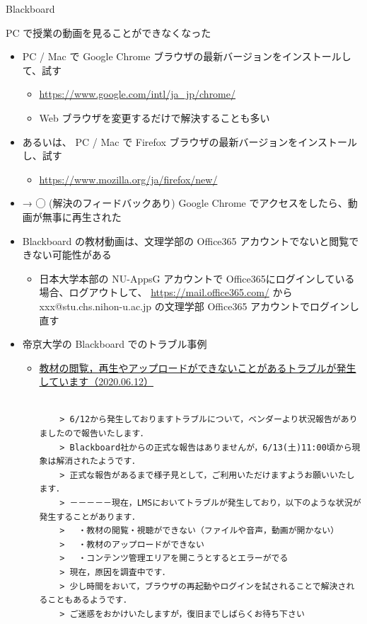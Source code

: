 \documentclass[a4j,10pt]{jsarticle}
\begin{document}
{\begin{frame}[label={sec:org166405d},fragile]{Blackboard}
\begin{block}{PC で授業の動画を見ることができなくなった}
\begin{itemize}
\par
\item PC / Mac で Google Chrome ブラウザの最新バージョンをインストールして、試す
\begin{itemize}
\item \url{https://www.google.com/intl/ja\_jp/chrome/}
\item Web ブラウザを変更するだけで解決することも多い
\end{itemize}
\par
\item あるいは、 PC / Mac で Firefox ブラウザの最新バージョンをインストールし、試す
\begin{itemize}
\item \url{https://www.mozilla.org/ja/firefox/new/}
\end{itemize}
\par
\item → ◯ (解決のフィードバックあり) Google Chrome でアクセスをしたら、動画が無事に再生された
\par
\item Blackboard の教材動画は、文理学部の Office365 アカウントでないと閲覧できない可能性がある
\begin{itemize}
\item 日本大学本部の NU-AppsG アカウントで Office365にログインしている場合、ログアウトして、
\url{https://mail.office365.com/} から xxx@stu.chs.nihon-u.ac.jp の文理学部 Office365 アカウントでログインし直す
\end{itemize}
\par
\item 帝京大学の Blackboard でのトラブル事例
\begin{itemize}
\item \href{http://www.lt-lab.teikyo-u.ac.jp/lms-ss/index.php?\%A4\%AA\%C3\%CE\%A4\%E9\%A4\%BB\%2F\%B2\%E1\%B5\%EE\%A4\%CE\%C9\%D4\%B6\%F1\%B9\%E7\%BE\%F0\%CA\%F3}{教材の閲覧，再生やアップロードができないことがあるトラブルが発生しています（2020.06.12）}
\par
\begin{verbatim}

    > 6/12から発生しておりますトラブルについて，ベンダーより状況報告がありましたので報告いたします．
    > Blackboard社からの正式な報告はありませんが，6/13(土)11:00頃から現象は解消されたようです．
    > 正式な報告があるまで様子見として，ご利用いただけますようお願いいたします．
    > －－－－－現在，LMSにおいてトラブルが発生しており，以下のような状況が発生することがあります．
    > 　・教材の閲覧・視聴ができない（ファイルや音声，動画が開かない）
    > 　・教材のアップロードができない
    > 　・コンテンツ管理エリアを開こうとするとエラーがでる
    > 現在，原因を調査中です．
    > 少し時間をおいて，ブラウザの再起動やログインを試されることで解決されることもあるようです．
    > ご迷惑をおかけいたしますが，復旧までしばらくお待ち下さい\end{verbatim}


\end{itemize}
\end{itemize}
\end{block}
\end{frame}}
\end{document}
